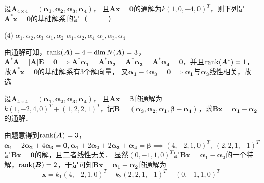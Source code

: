 \documentclass[12pt, a4paper, oneside, UTF8]{ctexbook}
\begin{document}
\begin{example}
    设$\bm{A}_{4\times 4}=(\bm{\alpha_1} , \bm{\alpha_2} , \bm{\alpha_3} , \bm{\alpha_4})$，
    且$\bm{Ax}=\bm{0}$的通解为$k(1 , 0 , -4 , 0)^T$，则下列是$\bm{A}^*\bm{x}=\bm{0}$的基础解系的是（~~~~~~）
    \begin{tasks}[style = itemize,label = \Alph*.](4)
    \task $\alpha_1,\alpha_2,\alpha_3$
    \task $\alpha_1,\alpha_2$
    \task $\alpha_1,\alpha_2,\alpha_4$
    \task $\alpha_1,\alpha_3,\alpha_4$
    \end{tasks}
\end{example}
\begin{solution}
    由通解可知，$\mathrm{rank}(\bm{A}) =4-\operatorname{dim}N(\bm{A})= 3$，\\
    $\bm{A}^*\bm{A}=|\bm{A}|\bm{E}=\bm{0}\implies\bm{A}^*\bm{\alpha_1}=\bm{A}^*\bm{\alpha_2}=
    \bm{A}^*\bm{\alpha_3}=\bm{A}^*\bm{\alpha_4}=\bm{0}$，并且$\mathrm{rank}(\bm{A}^*)=1$，故$\bm{A}^*\bm{x}=\bm{0}$的基础解系有3个解向量，
    又$\bm{\alpha_1}-4\bm{\alpha_3}=\bm{0}\implies\bm{\alpha_1}\text{与}\bm{\alpha_3}$线性相关，故选
\end{solution}
\begin{example}
    设$\bm{A}_{4\times 4}=(\bm{\alpha_1} , \bm{\alpha_2} , \bm{\alpha_3} , \bm{\alpha_4})$，
    且$\bm{Ax}=\bm{\beta}$的通解为$k(1 , -2 , 4 , 0)^T+(1, 2, 2,1)^T$，记$\bm{B}=(\bm{\alpha_3}, \bm{\alpha_2}, \bm{\alpha_1}, 
    \bm{\beta}-\bm{\alpha_4})$，求$\bm{Bx}=\bm{\alpha_1}-\bm{\alpha_2}$的通解．
\end{example}
\begin{solution}
    由题意得到$\mathrm{rank}(\bm{A})=3$，$\bm{\alpha_1}-2\bm{\alpha_2}+4\bm{\alpha_3}=\bm{0},\bm{\alpha_1}+2\bm{\alpha_2}+2\bm{\alpha_3}+\bm{\alpha_4}=\bm{\beta}
    \implies (4, -2, 1, 0)^T,\;(2, 2, 1, -1)^T$是$\bm{Bx}=\bm{0}$的解，且二者线性无关．
    显然$(0, -1, 1, 0)^T$是$\bm{Bx}=\bm{\alpha_1}-\bm{\alpha_2}$的一个特解，$\mathrm{rank}(\bm{B})=2$，于是可知$\bm{Bx}=\bm{\alpha_1}-\bm{\alpha_2}$的通解为
    \[
        \boxed{\bm{x} = k_1(4, -2, 1, 0)^T + k_2(2, 2, 1, -1)^T + (0, -1, 1, 0)^T}
    \]
\end{solution}
\end{document}

